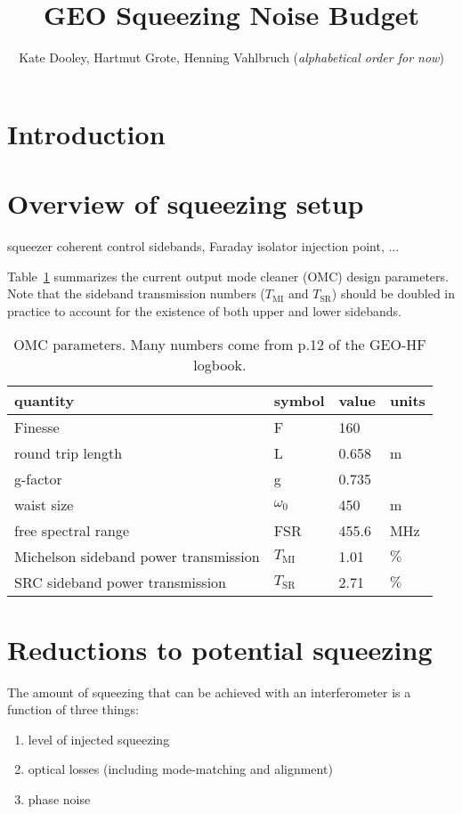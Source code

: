 \documentclass{ligodoc}
\title{GEO Squeezing Noise Budget}
\author{Kate Dooley, Hartmut Grote, Henning Vahlbruch (\emph{alphabetical order for now})}
\newcommand{\micro}{\textmu{}}
\begin{document}
\section{Introduction}


\section{Overview of squeezing setup}
squeezer coherent control sidebands, Faraday isolator injection point, ...


Table~\ref{tab:OMCparams} summarizes the current output mode cleaner
(OMC) design parameters. Note that the sideband transmission numbers
($T_{\mathrm{MI}}$ and $T_{\mathrm{SR}}$) should be doubled in
practice to account for the existence of both upper and lower
sidebands.

\begin{table}
\centering
\caption{OMC parameters. Many numbers come from p.12 of the GEO-HF logbook.}
\begin{tabular}{l l l l} %
\hline
quantity & symbol & value & units \\
\hline
Finesse & F & 160 & \\
round trip length & L & 0.658 & m \\
g-factor & g & 0.735 & \\
waist size & $\omega_0$ & 450 & \micro m \\
free spectral range & FSR & 455.6 & MHz \\
Michelson sideband power transmission & $T_{\mathrm{MI}}$ & 1.01 & $\%$ \\
SRC sideband power transmission & $T_{\mathrm{SR}}$ & 2.71 & $\%$ \\
\hline
\end{tabular}
\label{tab:OMCparams}
\end{table}



\section{Reductions to potential squeezing}
The amount of squeezing that can be achieved with an interferometer is
a function of three things:
\begin{enumerate}
\item level of injected squeezing
\item optical losses (including mode-matching and alignment)
\item phase noise
\end{enumerate}
\end{document}
